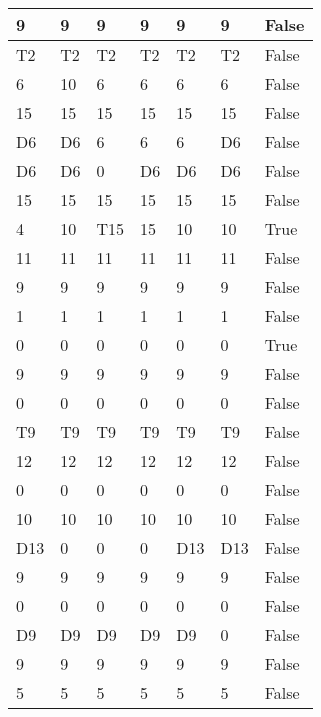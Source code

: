 \begin{longtable}[htbp]{| p{} | p{} | p{}| p{}| p{}| p{}| p{}|}
9 & 9 & 9 & 9 & 9 & 9 & False \\ \hline
\multicolumn{1}{|l|}{T2} & \multicolumn{1}{l|}{T2} & \multicolumn{1}{l|}{T2} & \multicolumn{1}{l|}{T2} & \multicolumn{1}{l|}{T2} & \multicolumn{1}{l|}{T2} & False \\ \hline
6 & 10 & 6 & 6 & 6 & 6 & False \\ \hline
15 & 15 & 15 & 15 & 15 & 15 & False \\ \hline
\multicolumn{1}{|l|}{D6} & \multicolumn{1}{l|}{D6} & 6 & 6 & 6 & \multicolumn{1}{l|}{D6} & False \\ \hline
\multicolumn{1}{|l|}{D6} & \multicolumn{1}{l|}{D6} & 0 & \multicolumn{1}{l|}{D6} & \multicolumn{1}{l|}{D6} & \multicolumn{1}{l|}{D6} & False \\ \hline
15 & 15 & 15 & 15 & 15 & 15 & False \\ \hline
4 & 10 & \multicolumn{1}{l|}{T15} & 15 & 10 & 10 & True \\ \hline
11 & 11 & 11 & 11 & 11 & 11 & False \\ \hline
9 & 9 & 9 & 9 & 9 & 9 & False \\ \hline
1 & 1 & 1 & 1 & 1 & 1 & False \\ \hline
0 & 0 & 0 & 0 & 0 & 0 & True \\ \hline
9 & 9 & 9 & 9 & 9 & 9 & False \\ \hline
0 & 0 & 0 & 0 & 0 & 0 & False \\ \hline
\multicolumn{1}{|l|}{T9} & \multicolumn{1}{l|}{T9} & \multicolumn{1}{l|}{T9} & \multicolumn{1}{l|}{T9} & \multicolumn{1}{l|}{T9} & \multicolumn{1}{l|}{T9} & False \\ \hline
12 & 12 & 12 & 12 & 12 & 12 & False \\ \hline
0 & 0 & 0 & 0 & 0 & 0 & False \\ \hline
10 & 10 & 10 & 10 & 10 & 10 & False \\ \hline
\multicolumn{1}{|l|}{D13} & 0 & 0 & 0 & \multicolumn{1}{l|}{D13} & \multicolumn{1}{l|}{D13} & False \\ \hline
9 & 9 & 9 & 9 & 9 & 9 & False \\ \hline
0 & 0 & 0 & 0 & 0 & 0 & False \\ \hline
\multicolumn{1}{|l|}{D9} & \multicolumn{1}{l|}{D9} & \multicolumn{1}{l|}{D9} & \multicolumn{1}{l|}{D9} & \multicolumn{1}{l|}{D9} & 0 & False \\ \hline
9 & 9 & 9 & 9 & 9 & 9 & False \\ \hline
5 & 5 & 5 & 5 & 5 & 5 & False \\ \hline

\end{longtable}
